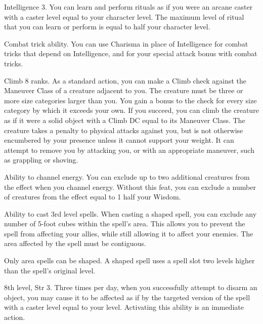 \featpre Intelligence 3.
\featben You can learn and perform rituals as if you were an arcane caster with a caster level equal to your character level. The maximum level of ritual that you can learn or perform is equal to half your character level.

\featpre Combat trick ability.
\featben You can use Charisma in place of Intelligence for combat tricks that depend on Intelligence, and for your special attack bonus with combat tricks.

\featpre Climb 8 ranks.
\featben As a standard action, you can make a Climb check against the Maneuver Class of a creature adjacent to you. The creature must be three or more size categories larger than you. You gain a  bonus to the check for every size category by which it exceeds your own. If you succeed, you can climb the creature as if it were a solid object with a Climb DC equal to its Maneuver Class. The creature takes a  penalty to physical attacks against you, but is not otherwise encumbered by your presence unless it cannot support your weight. It can attempt to remove you by attacking you, or with an appropriate maneuver, such as grappling or shoving.

 Ability to channel energy.
 You can exclude up to two additional creatures from the effect when you channel energy.
 Without this feat, you can exclude a number of creatures from the effect equal to 1 \add half your Wisdom.

 Ability to cast 3rd level spells.
 When casting a shaped spell, you can exclude any number of 5-foot cubes within the spell's area. This allows you to prevent the spell from affecting your allies, while still allowing it to affect your enemies. The area affected by the spell must be contiguous.

Only area spells can be shaped. A shaped spell uses a spell slot two levels higher than the spell's original level.

\featpre 8th level, Str 3.
\featben Three times per day, when you successfully attempt to disarm an object, you may cause it to be affected as if by the targeted version of the  spell with a caster level equal to your level. Activating this ability is an immediate action.


